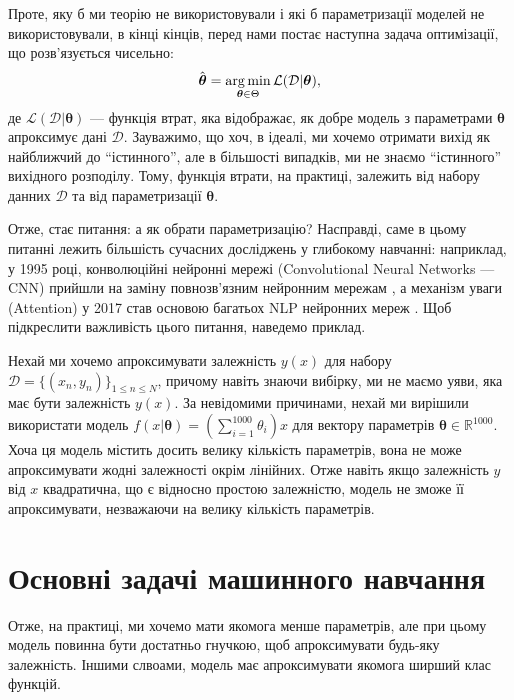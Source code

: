 Проте, яку б ми теорію не використовували і які б параметризації моделей не
використовували, в кінці кінців, перед нами постає наступна задача оптимізації, що
розв'язується чисельно:
\begin{equation}
	\hat{\boldsymbol{\theta}} = \operatorname*{arg\,min}_{\boldsymbol{\theta} \in \Theta} \mathcal{L}(\mathcal{D}|\boldsymbol{\theta}),
\end{equation}
де $\mathcal{L}(\mathcal{D}|\boldsymbol{\theta})$ --- функція втрат, яка
відображає, як добре модель з параметрами $\boldsymbol{\theta}$ апроксимує дані
$\mathcal{D}$. Зауважимо, що хоч, в ідеалі, ми хочемо отримати вихід як
найближчий до ``істинного'', але в більшості випадків, ми не знаємо
``істинного'' вихідного розподілу. Тому, функція втрати, на практиці, залежить
від набору данних $\mathcal{D}$ та від параметризації $\boldsymbol{\theta}$.

Отже, стає питання: а як обрати параметризацію? Насправді, саме в цьому питанні
лежить більшість сучасних досліджень у глибокому навчанні: наприклад, у 1995
році, конволюційні нейронні мережі (Convolutional Neural Networks --- CNN)
прийшли на заміну повнозв'язним нейронним мережам \cite{lecun}, а механізм уваги
(Attention) у 2017 став основою багатьох NLP нейронних мереж \cite{attention}.
Щоб підкреслити важливість цього питання, наведемо приклад.

\begin{example}
	Нехай ми хочемо апроксимувати залежність $y(x)$ для набору $\mathcal{D} =
	\{(x_n,y_n)\}_{1 \leq n \leq N}$, причому навіть знаючи вибірку, ми не маємо
	уяви, яка має бути залежність $y(x)$. За невідомими причинами, нехай ми
	вирішили використати модель $f(x|\boldsymbol{\theta}) =
	\left(\sum_{i=1}^{1000}\theta_i\right)x$ для вектору параметрів
	$\boldsymbol{\theta} \in \mathbb{R}^{1000}$. Хоча ця модель містить досить
	велику кількість параметрів, вона не може апроксимувати жодні залежності
	окрім лінійних. Отже навіть якщо залежність $y$ від $x$ квадратична, що
	є відносно простою залежністю, модель не зможе її апроксимувати, незважаючи 
	на велику кількість параметрів.
\end{example}

\section{Основні задачі машинного навчання}

Отже, на практиці, ми хочемо мати якомога менше параметрів, але при цьому 
модель повинна бути достатньо гнучкою, щоб апроксимувати будь-яку залежність. 
Іншими слвоами, модель має апроксимувати якомога ширший клас 
функцій. 

